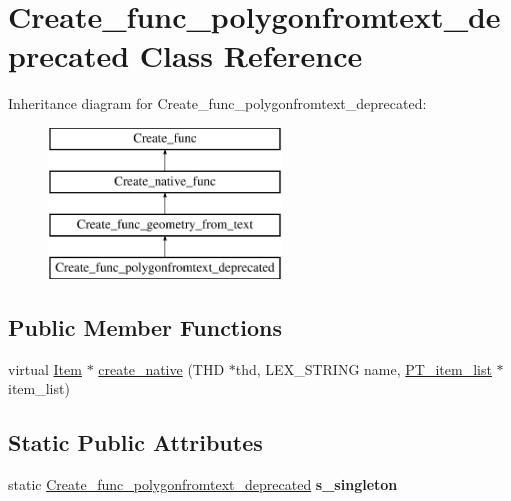 \hypertarget{classCreate__func__polygonfromtext__deprecated}{}\section{Create\+\_\+func\+\_\+polygonfromtext\+\_\+deprecated Class Reference}
\label{classCreate__func__polygonfromtext__deprecated}
Inheritance diagram for Create\+\_\+func\+\_\+polygonfromtext\+\_\+deprecated\+:\begin{figure}[H]
\begin{center}
\leavevmode
\includegraphics[height=4.000000cm]{classCreate__func__polygonfromtext__deprecated}
\end{center}
\end{figure}
\subsection*{Public Member Functions}
\begin{DoxyCompactItemize}
\item 
virtual \mbox{\hyperlink{classItem}{Item}} $\ast$ \mbox{\hyperlink{classCreate__func__polygonfromtext__deprecated_ae42cae5e01546d848a75369762244ca5}{create\+\_\+native}} (T\+HD $\ast$thd, L\+E\+X\+\_\+\+S\+T\+R\+I\+NG name, \mbox{\hyperlink{classPT__item__list}{P\+T\+\_\+item\+\_\+list}} $\ast$item\+\_\+list)
\end{DoxyCompactItemize}
\subsection*{Static Public Attributes}
\begin{DoxyCompactItemize}
\item 
\mbox{\label{classCreate__func__polygonfromtext__deprecated_a00fa0bb4d90e8d25175f150db27ab3e1}} 
static \mbox{\hyperlink{classCreate__func__polygonfromtext__deprecated}{Create\+\_\+func\+\_\+polygonfromtext\+\_\+deprecated}} {\bfseries s\+\_\+singleton}
\end{DoxyCompactItemize}
